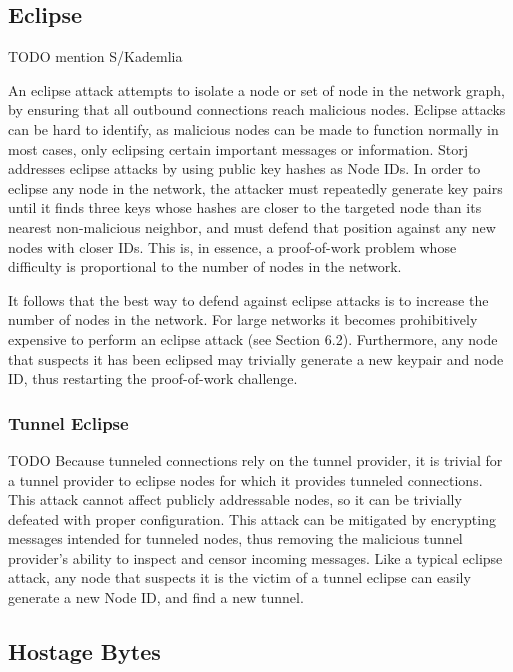 \documentclass[a4paper,10pt]{article} \usepackage[utf8]{inputenc}
\newcommand{\todo}[1]{{\color{red} TODO #1 }}
\begin{document}
\subsection{Eclipse}

\todo{mention S/Kademlia

An eclipse attack attempts to isolate a node or set of node in the network
graph, by ensuring that all outbound connections reach malicious nodes. Eclipse
attacks can be hard to identify, as malicious nodes can be made to function
normally in most cases, only eclipsing certain important messages or
information. Storj addresses eclipse attacks by using public key hashes as Node
IDs. In order to eclipse any node in the network, the attacker must repeatedly
generate key pairs until it finds three keys whose hashes are closer to the
targeted node than its nearest non-malicious neighbor, and must defend that
position against any new nodes with closer IDs. This is, in essence, a
proof-of-work problem whose difficulty is proportional to the number of nodes in
the network.

It follows that the best way to defend against eclipse attacks is to increase
the number of nodes in the network. For large networks it becomes prohibitively
expensive to perform an eclipse attack (see Section 6.2). Furthermore, any node
that suspects it has been eclipsed may trivially generate a new keypair and node
ID, thus restarting the proof-of-work challenge. }

\subsubsection{Tunnel Eclipse}

\todo{ Because tunneled connections rely on the tunnel provider, it is trivial
for a tunnel provider to eclipse nodes for which it provides tunneled
connections. This attack cannot affect publicly addressable nodes, so it can be
trivially defeated with proper configuration. This attack can be mitigated by
encrypting messages intended for tunneled nodes, thus removing the malicious
tunnel provider's ability to inspect and censor incoming messages. Like a
typical eclipse attack, any node that suspects it is the victim of a tunnel
eclipse can easily generate a new Node ID, and find a new tunnel. }

\subsection{Hostage Bytes}
\end{document}
